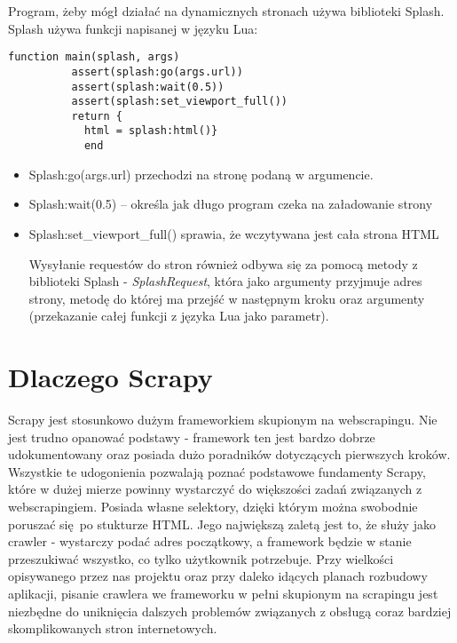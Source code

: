 Program, żeby mógł działać na dynamicznych stronach używa biblioteki Splash.
Splash używa funkcji napisanej w języku Lua:
\begin{lstlisting}
function main(splash, args)
          assert(splash:go(args.url))
          assert(splash:wait(0.5))
          assert(splash:set_viewport_full())
          return {
            html = splash:html()}
            end
\end{lstlisting}
\begin{itemize}
\item[] Splash:go(args.url) przechodzi na stronę podaną w argumencie.
\item[] Splash:wait(0.5) – określa jak długo program czeka na załadowanie strony
\item[] Splash:set\_viewport\_full() sprawia, że wczytywana jest cała strona HTML


Wysyłanie requestów do stron również odbywa się za pomocą metody z biblioteki Splash - \emph{SplashRequest}, która jako argumenty przyjmuje adres strony, metodę do której ma przejść w następnym kroku oraz argumenty (przekazanie całej funkcji z języka Lua jako parametr).
\end{itemize}
\section{Dlaczego Scrapy}
Scrapy jest stosunkowo dużym frameworkiem skupionym na webscrapingu. Nie jest trudno opanować podstawy - framework ten jest bardzo dobrze udokumentowany oraz posiada dużo poradników dotyczących pierwszych kroków. Wszystkie te udogonienia pozwalają poznać podstawowe fundamenty Scrapy, które w dużej mierze powinny wystarczyć do większości zadań związanych z webscrapingiem. Posiada własne selektory, dzięki którym można swobodnie poruszać się po stukturze HTML. Jego największą zaletą jest to, że służy jako crawler - wystarczy podać adres początkowy, a framework będzie w stanie przeszukiwać wszystko, co tylko użytkownik potrzebuje. Przy wielkości opisywanego przez nas projektu oraz przy daleko idących planach rozbudowy aplikacji, pisanie crawlera we frameworku w pełni skupionym na scrapingu jest niezbędne do uniknięcia dalszych problemów związanych z obsługą coraz bardziej skomplikowanych stron internetowych.
